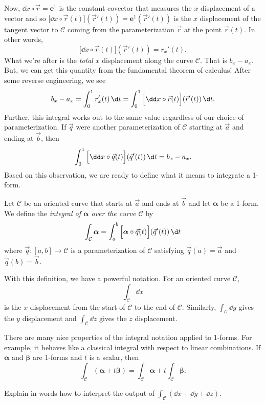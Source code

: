 Now, $\dd x\circ \vec r = \bm e^1$ is the constant covector that measures
the $x$ displacement of a vector and so $\Big[\dd x\circ \vec r(t)\Big](\vec r'(t))
=\bm e^1(\vec r'(t))$
is the $x$ displacement of the tangent vector to $\mathcal C$ coming
from the parameterization $\vec r$ at the point $\vec r(t)$.   In other words,
\[
	\Big[\dd x\circ \vec r(t)\Big](\vec r'(t)) = r_x'(t).
\]
What we're after is the \emph{total} $x$ displacement along the curve $\mathcal C$.
That is $b_x-a_x$.  But, we can get this quantity from the fundamental theorem
of calculus!  After some reverse engineering, we see
\[
	b_x-a_x = \int_0^1 r_x'(t)\, \d t = \int_0^1 \Big[\dd x\circ \vec r(t)\Big](\vec r'(t))\,\d t.
\]
Further, this integral works out to the same value regardless of our
choice of parameterization.  If $\vec q$ were another parameterization 
of $\mathcal C$ starting
at $\vec a$ and ending at $\vec b$, then 
\[
\int_0^1 \Big[\dd x\circ \vec q(t)\Big](\vec q'(t))\,\d t=b_x-a_x.
\]
Based on this observation,
we are ready to define what it means to integrate a 1-form.

\begin{definition}
	Let $\mathcal C$ be an oriented curve that starts at $\vec a$
	and ends at $\vec b$ and let $\bm \alpha$ be a 1-form.  We define
	the \emph{integral of $\bm \alpha$ over the curve $\mathcal C$}
	by
	\[
		\int_{\mathcal C}\bm\alpha 
		= \int_a^b \Big[\bm\alpha\circ \vec q(t)\Big](\vec q'(t))\,\d t
	\]
	where $\vec q:[a,b]\to\mathcal C$ is a parameterization of
	$\mathcal C$ satisfying $\vec q(a)=\vec a$ and $\vec q(b)=\vec b$.
\end{definition}

With this definition, we have a powerful notation.  For an oriented curve $\mathcal C$,
\[
	\int_{\mathcal C} \dd x
\]
is the $x$ displacement from the start of $\mathcal C$ to the end of $\mathcal C$.
Similarly, $\int_{\mathcal C}\dd y$ gives the $y$ displacement and $\int_{\mathcal C}\dd z$
gives the $z$ displacement.

There are many nice properties of the integral notation applied to 1-forms.
For example, it behaves like a classical integral with respect to linear combinations.
If $\bm\alpha$ and $\bm\beta$ are 1-forms and $t$ is a scalar, then
\[
	\int_{\mathcal C}(\bm \alpha + t\bm\beta) = \int_{\mathcal C} \bm\alpha 
	+ t\int_{\mathcal C} \bm\beta.
\]

\begin{exercise}
	Explain in words how to interpret
	the output of $\int_{\mathcal C} (\dd x+\dd y +\dd z)$.
\end{exercise}


